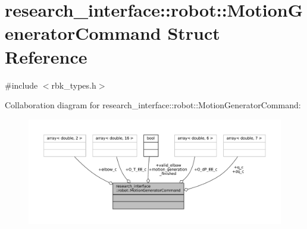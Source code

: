 \hypertarget{structresearch__interface_1_1robot_1_1MotionGeneratorCommand}{}\section{research\+\_\+interface\+:\+:robot\+:\+:Motion\+Generator\+Command Struct Reference}
\label{structresearch__interface_1_1robot_1_1MotionGeneratorCommand}


{\ttfamily \#include $<$rbk\+\_\+types.\+h$>$}



Collaboration diagram for research\+\_\+interface\+:\+:robot\+:\+:Motion\+Generator\+Command\+:
\nopagebreak
\begin{figure}[H]
\begin{center}
\leavevmode
\includegraphics[width=350pt]{structresearch__interface_1_1robot_1_1MotionGeneratorCommand__coll__graph}
\end{center}
\end{figure}
